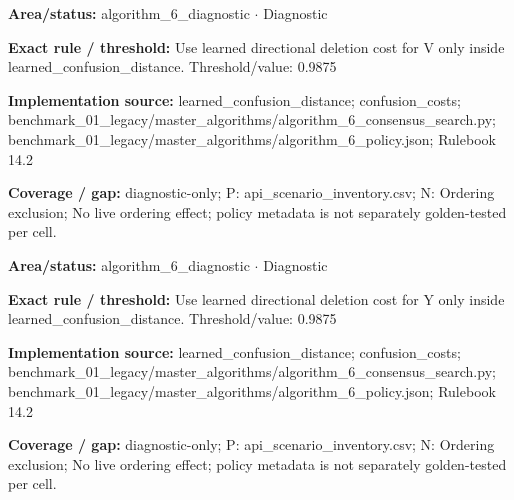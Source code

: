\begin{tcolorbox}[enhanced,breakable,colback=white,colframe=Muted!45,boxrule=0.45pt,arc=1.5pt,left=6pt,right=6pt,top=5pt,bottom=5pt,title={\texttt{A6-LEARNED-DELETION-V}},title after break={\texttt{A6-LEARNED-DELETION-V}\ (continued)},fonttitle=\headingfont\bfseries\color{Navy},coltitle=Navy]
\textbf{Area/status:} algorithm\_\allowbreak{}6\_\allowbreak{}diagnostic $\boldsymbol{\cdot}$ Diagnostic\par
\smallskip
\textbf{Exact rule / threshold:} Use learned directional deletion cost for V only inside learned\_\allowbreak{}confusion\_\allowbreak{}distance. Threshold/\allowbreak{}value: 0.9875\par
\smallskip
\textbf{Implementation source:} learned\_\allowbreak{}confusion\_\allowbreak{}distance; confusion\_\allowbreak{}costs; benchmark\_\allowbreak{}01\_\allowbreak{}legacy/\allowbreak{}master\_\allowbreak{}algorithms/\allowbreak{}algorithm\_\allowbreak{}6\_\allowbreak{}consensus\_\allowbreak{}search.py; benchmark\_\allowbreak{}01\_\allowbreak{}legacy/\allowbreak{}master\_\allowbreak{}algorithms/\allowbreak{}algorithm\_\allowbreak{}6\_\allowbreak{}policy.json; Rulebook 14.2\par
\smallskip
\textbf{Coverage / gap:} diagnostic-only; P: api\_\allowbreak{}scenario\_\allowbreak{}inventory.csv; N: Ordering exclusion; No live ordering effect; policy metadata is not separately golden-tested per cell.
\end{tcolorbox}
\begin{tcolorbox}[enhanced,breakable,colback=white,colframe=Muted!45,boxrule=0.45pt,arc=1.5pt,left=6pt,right=6pt,top=5pt,bottom=5pt,title={\texttt{A6-LEARNED-DELETION-Y}},title after break={\texttt{A6-LEARNED-DELETION-Y}\ (continued)},fonttitle=\headingfont\bfseries\color{Navy},coltitle=Navy]
\textbf{Area/status:} algorithm\_\allowbreak{}6\_\allowbreak{}diagnostic $\boldsymbol{\cdot}$ Diagnostic\par
\smallskip
\textbf{Exact rule / threshold:} Use learned directional deletion cost for Y only inside learned\_\allowbreak{}confusion\_\allowbreak{}distance. Threshold/\allowbreak{}value: 0.9875\par
\smallskip
\textbf{Implementation source:} learned\_\allowbreak{}confusion\_\allowbreak{}distance; confusion\_\allowbreak{}costs; benchmark\_\allowbreak{}01\_\allowbreak{}legacy/\allowbreak{}master\_\allowbreak{}algorithms/\allowbreak{}algorithm\_\allowbreak{}6\_\allowbreak{}consensus\_\allowbreak{}search.py; benchmark\_\allowbreak{}01\_\allowbreak{}legacy/\allowbreak{}master\_\allowbreak{}algorithms/\allowbreak{}algorithm\_\allowbreak{}6\_\allowbreak{}policy.json; Rulebook 14.2\par
\smallskip
\textbf{Coverage / gap:} diagnostic-only; P: api\_\allowbreak{}scenario\_\allowbreak{}inventory.csv; N: Ordering exclusion; No live ordering effect; policy metadata is not separately golden-tested per cell.
\end{tcolorbox}

